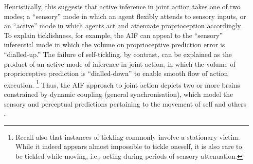 \begin{CJK}{UTF8}{gbsn}
Heuristically, this suggests that active inference in joint action takes one of two modes; a ``sensory'' mode in which an agent flexibly attends to sensory inputs, or an ``active'' mode in which agents act and attenuate proprioception accordingly \citep{Friston2015}. To explain ticklishness, for example, the AIF can appeal to the ``sensory'' inferential mode in which the volume on proprioceptive prediction error is ``dialled-up.''  The failure of self-tickling, by contrast, can be explained as the product of an active mode of inference in joint action, in which the volume of proprioceptive prediction is ``dialled-down'' to enable smooth flow of action execution.
  \footnote{Recall also that instances of tickling commonly involve a stationary victim. While it indeed appears almost impossible to tickle oneself, it is also rare to be tickled while moving, i.e., acting during periods of sensory attenuation.}
Thus, the AIF approach to joint action depicts two or more brains constrained by dynamic coupling (general synchronisation), which model the sensory and perceptual predictions pertaining to the movement of self and others \citep{Pesquita2017}.






















































\end{CJK}
